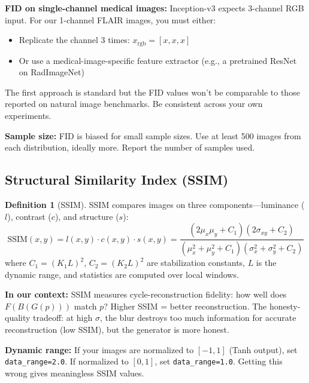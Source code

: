 \documentclass[11pt,a4paper]{article}
\theoremstyle{definition}
\newtheorem{definition}{Definition}[section]
\begin{document}
\begin{edgecase}
\textbf{FID on single-channel medical images:} Inception-v3 expects 3-channel RGB input. For our 1-channel FLAIR images, you must either:
\begin{itemize}
    \item Replicate the channel 3 times: $x_{\text{rgb}} = [x, x, x]$
    \item Or use a medical-image-specific feature extractor (e.g., a pretrained ResNet on RadImageNet)
\end{itemize}
The first approach is standard but the FID values won't be comparable to those reported on natural image benchmarks. Be consistent across your own experiments.

\vspace{0.3em}
\textbf{Sample size:} FID is biased for small sample sizes. Use at least 500 images from each distribution, ideally more. Report the number of samples used.
\end{edgecase}

\subsection{Structural Similarity Index (SSIM)}

\begin{definition}[SSIM]
SSIM compares images on three components---luminance ($l$), contrast ($c$), and structure ($s$):
\begin{equation}
    \text{SSIM}(x, y) = l(x,y) \cdot c(x,y) \cdot s(x,y) = \frac{(2\mu_x\mu_y + C_1)(2\sigma_{xy} + C_2)}{(\mu_x^2 + \mu_y^2 + C_1)(\sigma_x^2 + \sigma_y^2 + C_2)}
\end{equation}
where $C_1 = (K_1 L)^2$, $C_2 = (K_2 L)^2$ are stabilization constants, $L$ is the dynamic range, and statistics are computed over local windows.
\end{definition}

\textbf{In our context:} SSIM measures cycle-reconstruction fidelity: how well does $F(B(G(p)))$ match $p$? Higher SSIM = better reconstruction. The honesty-quality tradeoff: at high $\sigma$, the blur destroys too much information for accurate reconstruction (low SSIM), but the generator is more honest.

\begin{edgecase}
\textbf{Dynamic range:} If your images are normalized to $[-1, 1]$ (Tanh output), set \texttt{data\_range=2.0}. If normalized to $[0, 1]$, set \texttt{data\_range=1.0}. Getting this wrong gives meaningless SSIM values.
\end{edgecase}
\end{document}
